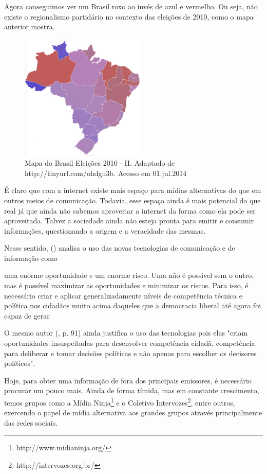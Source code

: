 \documentclass[
	article,			%
	12pt,				%
	oneside,			%
	a4paper,			%
	english,			%
	brazil,				%
	]{abntex2}
\begin{document}
Agora conseguimos ver um Brasil roxo ao invés de azul e vermelho. Ou seja, não existe o regionalismo partidário no contexto das eleições de 2010, como o mapa anterior mostra.

\begin{figure}[ht!]
\centering
\includegraphics[width=60mm,height=60mm]{mapa_2.png}
\caption{Mapa do Brasil Eleições 2010 - II. Adaptado de http://tinyurl.com/ohdgu3b. Acesso em 01.jul.2014}
\label{overflow}
\end{figure}

É claro que com a internet existe mais espaço para mídias alternativas do que em outros meios de comunicação. Todavia, esse espaço ainda é mais potencial do que real já que ainda não sabemos aproveitar a internet da forma como ela pode ser aproveitada. Talvez a sociedade ainda não esteja pronta para emitir e consumir informações, questionando a origem e a veracidade das mesmas. 

Nesse sentido,  (\citeyear{boaventura2005}) analisa o uso das novas tecnologias de comunicação e de informação como 

\begin{citacao}
uma enorme oportunidade e um enorme risco. Uma não é possível sem o outro, mas é possível maximizar as oportunidades e minimizar os riscos. Para isso, é necessário criar e aplicar generalizadamente níveis de competência técnica e política nos cidadãos muito acima daqueles que a democracia liberal até agora foi capaz de gerar \cite[p.90]{boaventura2005}
\end{citacao}

O mesmo autor (\citeyear{boaventura2005}, p. 91) ainda justifica o uso das tecnologias pois elas "criam oportunidades insuspeitadas para desenvolver competência cidadã, competência para deliberar e tomar decisões políticas e não apenas para escolher os decisores políticos".

Hoje, para obter uma informação de fora dos principais emissores, é necessário procurar um pouco mais. Ainda de forma tímida, mas em constante crescimento, temos grupos como a Mídia Ninja\footnote{http://www.midianinja.org/} e o Coletivo Intervozes\footnote{http://intervozes.org.br/}, entre outros, exercendo o papel de mídia alternativa aos grandes grupos através principalmente das redes sociais. 
\end{document}
